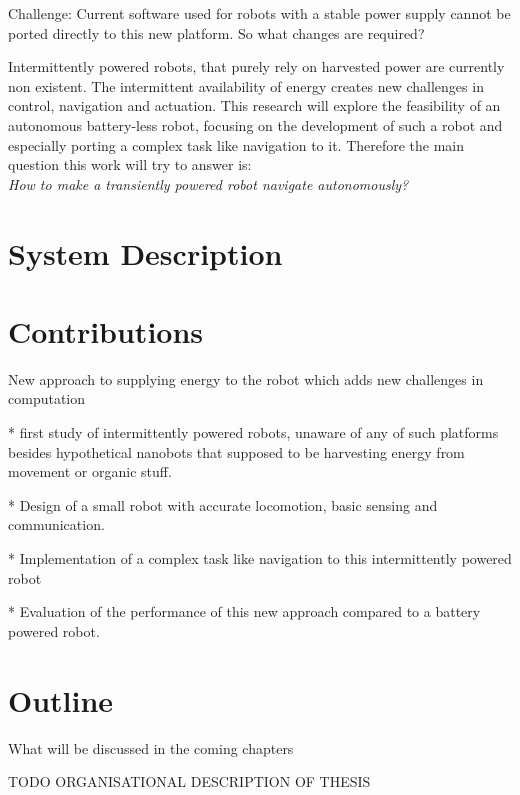 Challenge:
Current software used for robots with a stable power supply cannot be ported directly to this new platform.
So what changes are required?

Intermittently powered robots, that purely rely on harvested power are currently non existent.
The intermittent availability of energy creates new challenges in control, navigation and actuation. 
This research will explore the feasibility of an autonomous battery-less robot, focusing on the development of such a robot and especially porting a complex task like navigation to it. 
Therefore the main question this work will try to answer is: \\
\textit{How to make a transiently powered robot navigate autonomously?}

\section{System Description}



\section{Contributions}

New approach to supplying energy to the robot which adds new challenges in computation

* first study of intermittently powered robots, unaware of any of such platforms besides hypothetical nanobots that supposed to be harvesting energy from movement or organic stuff.

* Design of a small robot with accurate locomotion, basic sensing and communication.

* Implementation of a complex task like navigation to this intermittently powered robot

* Evaluation of the performance of this new approach compared to a battery powered robot.

\section{Outline}
What will be discussed in the coming chapters


\vspace{1\baselineskip}

\noindent
TODO ORGANISATIONAL DESCRIPTION OF THESIS

